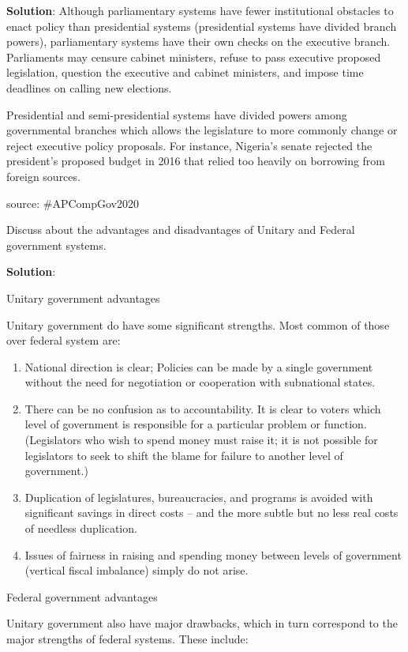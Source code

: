 \documentclass[
  openany]{book}
\newcommand{\question}{\item}
\newenvironment{solution}{ {\bfseries Solution}:}{}
\begin{document}
\begin{questions}
\begin{solution}
Although parliamentary systems have fewer institutional obstacles to enact policy than presidential systems (presidential systems have divided branch powers), parliamentary systems have their own checks on the executive branch. Parliaments may censure cabinet ministers, refuse to pass executive proposed legislation, question the executive and cabinet ministers, and impose time deadlines on calling new elections.

Presidential and semi-presidential systems have divided powers among governmental branches which allows the legislature to more commonly change or reject executive policy proposals. For instance, Nigeria's senate rejected the president's proposed budget in 2016 that relied too heavily on borrowing from foreign sources.

source: \#APCompGov2020
\end{solution}

\question Discuss about the advantages and disadvantages of Unitary and Federal government systems.

\begin{solution}

Unitary government advantages

Unitary government do have some significant strengths. Most common of those over federal system are:

\begin{enumerate}
\item National direction is clear; Policies can be made by a single government without the need for negotiation or cooperation with subnational states.
\item There can be no confusion as to accountability. It is clear to voters which level of government is responsible for a particular problem or function. (Legislators who wish to spend money must raise it; it is not possible for legislators to seek to shift the blame for failure to another level of government.)
\item Duplication of legislatures, bureaucracies, and programs is avoided with significant savings in direct costs -- and the more subtle but no less real costs of needless duplication.
\item Issues of fairness in raising and spending money between levels of government (vertical fiscal imbalance) simply do not arise.
\end{enumerate}

Federal government advantages

Unitary government also have major drawbacks, which in turn correspond to the major strengths of federal systems. These include:


\end{solution}
\end{questions}
\end{document}
